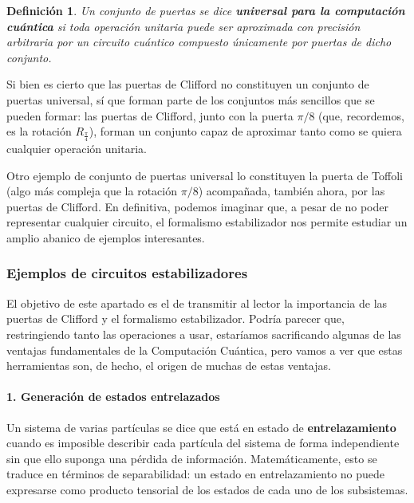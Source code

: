 \documentclass[11pt,a4paper,twoside,pdf]{article}
\numberwithin{equation}{section}
\newtheorem{definition}{Definición}
\begin{document}
			\begin{definition}
				Un conjunto de puertas se dice \textbf{universal para la computación cuántica} si toda operación unitaria puede ser aproximada con precisión arbitraria por un circuito cuántico compuesto únicamente por puertas de dicho conjunto.
			\end{definition}
		
			Si bien es cierto que las puertas de Clifford no constituyen un conjunto de puertas universal, sí que forman parte de los conjuntos más sencillos que se pueden formar: las puertas de Clifford, junto con la puerta $\pi/8$ (que, recordemos, es la rotación $R_\frac{\pi}{4}$), forman un conjunto capaz de aproximar tanto como se quiera cualquier operación unitaria. 
			
			Otro ejemplo de conjunto de puertas universal lo constituyen la puerta de Toffoli (algo más compleja que la rotación $\pi/8$) acompañada, también ahora, por las puertas de Clifford. En definitiva, podemos imaginar que, a pesar de no poder representar cualquier circuito, el formalismo estabilizador nos permite estudiar un amplio abanico de ejemplos interesantes. 
			
				
		\subsubsection{Ejemplos de circuitos estabilizadores} \label{subsubsec: ejemplos estabilizador}
		
		El objetivo de este apartado es el de transmitir al lector la importancia de las puertas de Clifford y el formalismo estabilizador. Podría parecer que, restringiendo tanto las operaciones a usar, estaríamos sacrificando algunas de las ventajas fundamentales de la Computación Cuántica, pero vamos a ver que estas herramientas son, de hecho, el origen de muchas de estas ventajas. 
		
		
			\paragraph{1. Generación de estados entrelazados} \hspace{1pt}
		
			Un sistema de varias partículas se dice que está en estado de \textbf{entrelazamiento} cuando es imposible describir cada partícula del sistema de forma independiente sin que ello suponga una pérdida de información. Matemáticamente, esto se traduce en términos de separabilidad: un estado en entrelazamiento no puede expresarse como producto tensorial de los estados de cada uno de los subsistemas.
			
\end{document}
